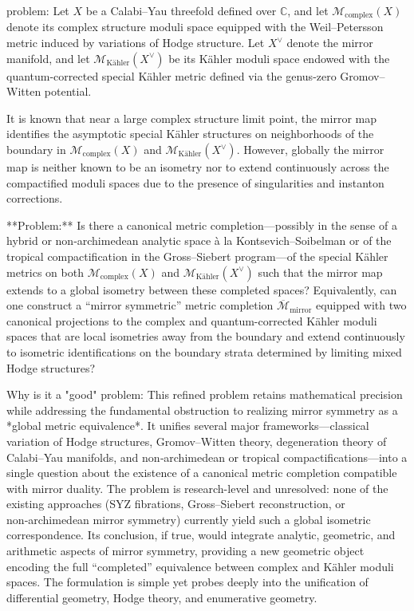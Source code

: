 problem:  
Let \( X \) be a Calabi–Yau threefold defined over \( \mathbb{C} \), and let \( \mathcal{M}_{\mathrm{complex}}(X) \) denote its complex structure moduli space equipped with the Weil–Petersson metric induced by variations of Hodge structure. Let \( X^\vee \) denote the mirror manifold, and let \( \mathcal{M}_{\mathrm{Kähler}}(X^\vee) \) be its Kähler moduli space endowed with the quantum-corrected special Kähler metric defined via the genus-zero Gromov–Witten potential.  

It is known that near a large complex structure limit point, the mirror map identifies the asymptotic special Kähler structures on neighborhoods of the boundary in \( \mathcal{M}_{\mathrm{complex}}(X) \) and \( \mathcal{M}_{\mathrm{Kähler}}(X^\vee) \). However, globally the mirror map is neither known to be an isometry nor to extend continuously across the compactified moduli spaces due to the presence of singularities and instanton corrections.  

**Problem:**  
Is there a canonical metric completion—possibly in the sense of a hybrid or non‑archimedean analytic space à la Kontsevich–Soibelman or of the tropical compactification in the Gross–Siebert program—of the special Kähler metrics on both \( \mathcal{M}_{\mathrm{complex}}(X) \) and \( \mathcal{M}_{\mathrm{Kähler}}(X^\vee) \) such that the mirror map extends to a global isometry between these completed spaces?  
Equivalently, can one construct a “mirror symmetric” metric completion \( \overline{\mathcal{M}}_{\mathrm{mirror}} \) equipped with two canonical projections to the complex and quantum-corrected Kähler moduli spaces that are local isometries away from the boundary and extend continuously to isometric identifications on the boundary strata determined by limiting mixed Hodge structures?  

Why is it a "good" problem:  
This refined problem retains mathematical precision while addressing the fundamental obstruction to realizing mirror symmetry as a *global metric equivalence*. It unifies several major frameworks—classical variation of Hodge structures, Gromov–Witten theory, degeneration theory of Calabi–Yau manifolds, and non‑archimedean or tropical compactifications—into a single question about the existence of a canonical metric completion compatible with mirror duality. The problem is research-level and unresolved: none of the existing approaches (SYZ fibrations, Gross–Siebert reconstruction, or non‑archimedean mirror symmetry) currently yield such a global isometric correspondence. Its conclusion, if true, would integrate analytic, geometric, and arithmetic aspects of mirror symmetry, providing a new geometric object encoding the full “completed” equivalence between complex and Kähler moduli spaces. The formulation is simple yet probes deeply into the unification of differential geometry, Hodge theory, and enumerative geometry.